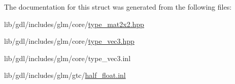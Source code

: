 The documentation for this struct was generated from the following files\+:\begin{DoxyCompactItemize}
\item 
lib/gdl/includes/glm/core/\hyperlink{type__mat2x2_8hpp}{type\+\_\+mat2x2.\+hpp}\item 
lib/gdl/includes/glm/core/\hyperlink{type__vec3_8hpp}{type\+\_\+vec3.\+hpp}\item 
lib/gdl/includes/glm/core/type\+\_\+vec3.\+inl\item 
lib/gdl/includes/glm/gtc/\hyperlink{half__float_8inl}{half\+\_\+float.\+inl}\end{DoxyCompactItemize}

